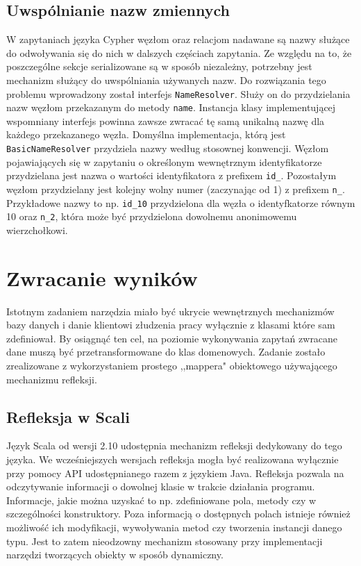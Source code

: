 \documentclass[brudnopis]{xmgr}
\begin{document}
\subsection{Uwspólnianie nazw zmiennych}

W zapytaniach języka Cypher węzłom oraz relacjom nadawane są nazwy służące do odwoływania się do nich w dalszych częściach zapytania. Ze względu na to, że poszczególne sekcje serializowane są w sposób niezależny, potrzebny jest mechanizm służący do uwspólniania używanych nazw. Do rozwiązania tego problemu wprowadzony został interfejs \texttt{NameResolver}. Służy on do przydzielania nazw węzłom przekazanym do metody \texttt{name}. Instancja klasy implementującej wspomniany interfejs powinna zawsze zwracać tę samą unikalną nazwę dla każdego przekazanego węzła. Domyślna implementacja, którą jest \texttt{BasicNameResolver} przydziela nazwy według stosownej konwencji. Węzłom pojawiających się w zapytaniu o określonym wewnętrznym identyfikatorze przydzielana jest nazwa o wartości identyfikatora z prefixem \texttt{id\_}. Pozostałym węzłom przydzielany jest kolejny wolny numer (zaczynając od 1) z prefixem \texttt{n\_}. Przykładowe nazwy to np. \texttt{id\_10} przydzielona dla węzła o identyfkatorze równym 10 oraz \texttt{n\_2}, która może być przydzielona dowolnemu anonimowemu wierzchołkowi.

\section{Zwracanie wyników}

Istotnym zadaniem narzędzia miało być ukrycie wewnętrznych mechanizmów bazy danych i danie klientowi złudzenia pracy wyłącznie z klasami które sam zdefiniował. By osiągnąć ten cel, na poziomie wykonywania zapytań zwracane dane muszą być przetransformowane do klas domenowych. Zadanie zostało zrealizowane z wykorzystaniem prostego ,,mappera" obiektowego używającego mechanizmu refleksji.

\subsection{Refleksja w Scali}

Język Scala od wersji 2.10 udostępnia mechanizm refleksji dedykowany do tego języka. We wcześniejszych wersjach refleksja mogła być realizowana wyłącznie przy pomocy API udostępnianego razem z językiem Java. Refleksja pozwala na odczytywanie informacji o dowolnej klasie w trakcie działania programu. Informacje, jakie można uzyskać to np. zdefiniowane pola, metody czy w szczególności konstruktory. Poza informacją o dostępnych polach istnieje również możliwość ich modyfikacji, wywoływania metod czy tworzenia instancji danego typu. Jest to zatem nieodzowny mechanizm stosowany przy implementacji narzędzi tworzących obiekty w sposób dynamiczny.
\end{document}
